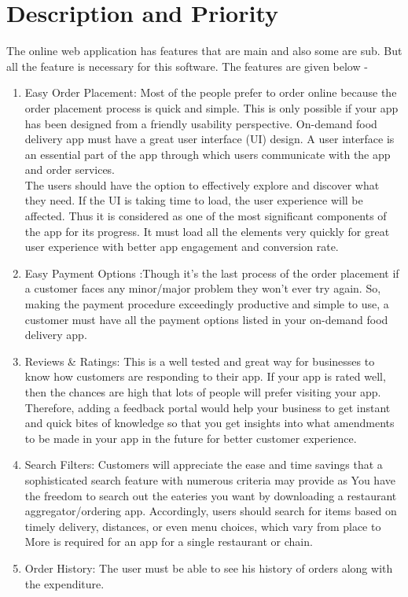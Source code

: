 \documentclass{scrreprt}
\begin{document}
\section{Description and Priority}
The online web application has features that are main and also some are sub. But all the feature is necessary for this software.
\newline
The features are given below - 
\begin{enumerate}
\item Easy Order Placement: Most of the people prefer to order online because the order placement process is quick and simple. This is only possible if your app has been designed from a friendly usability perspective. On-demand food delivery app must have a great user interface (UI) design. A user interface is an essential part of the app through which users communicate with the app and order services. \\

The users should have the option to effectively explore and discover what they need. If the UI is taking time to load, the user experience will be affected. Thus it is considered as one of the most significant components of the app for its progress. It must load all the elements very quickly for great user experience with better app engagement and conversion rate.
    \item Easy Payment Options :Though it’s the last process of the order placement if a customer faces any minor/major problem they won’t ever try again. So, making the payment procedure exceedingly productive and simple to use, a customer must have all the payment options listed in your on-demand food delivery app.
    \item Reviews & Ratings: This is a well tested and great way for businesses to know how customers are responding to their app. If your app is rated well, then the chances are high that lots of people will prefer visiting your app. Therefore, adding a feedback portal would help your business to get instant and quick bites of knowledge so that you get insights into what amendments to be made in your app in the future for better customer experience.
    \item Search Filters: Customers will appreciate the ease and time savings that a sophisticated search feature with numerous criteria may provide as You have the freedom to search out the eateries you want by downloading a restaurant aggregator/ordering app. Accordingly, users should search for items based on timely delivery, distances, or even menu choices, which vary from place to More is required for an app for a single restaurant or chain.
    \item Order History: The user must be able to see his history of orders along with the expenditure. 

\end{enumerate}
\end{document}
